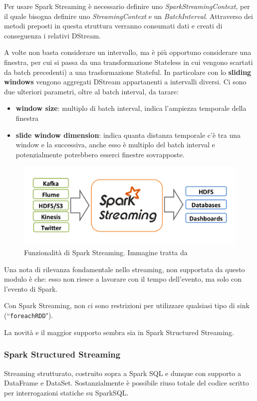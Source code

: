 \documentclass[12pt,italian]{article}
\begin{document}
Per usare Spark Streaming è necessario definire uno \textit{SparkStreamingContext}, per il quale bisogna definire uno \textit{StreamingContext} e un \textit{BatchInterval}.
Attraverso dei metodi preposti in questa struttura verranno consumati dati e creati di conseguenza i relativi DStream.

A volte non basta considerare un intervallo, ma è più opportuno considerare una finestra, per cui si passa da una transformazione Stateless in cui vengono scartati da batch precedenti) a una trasformazione Stateful. In particolare con lo \textbf{sliding windows} vengono aggregati DStream appartanenti a intervalli diversi.
Ci sono due ulteriori parametri, oltre al batch interval, da tarare:
\begin{itemize}
	\item \textbf{window size}: multiplo di batch interval, indica l'ampiezza temporale della finestra
	\item \textbf{slide window dimension}: indica quanta distanza temporale c'è tra una window e la successiva, anche esso è multiplo del batch interval e potenzialmente potrebbero esserci finestre sovrapposte.
\end{itemize}
\begin{figure}
	\centering 
	\includegraphics[width=0.8\linewidth]{img/sparkStreaming.png}
	\caption{Funzionalità di Spark Streaming. Immagine tratta da \cite{spark}}
	\label{fig:SparkStreaming}
\end{figure}
\par Una nota di rilevanza fondamentale nello streaming, non supportata da questo modulo è che: esso non riesce a lavorare con il tempo dell'evento, ma solo con l'evento di Spark.

\par Con Spark Streaming, non ci sono restrizioni per utilizzare qualsiasi tipo di sink (``\texttt{foreachRDD}"). %

\par La novità e il maggior supporto sembra sia in Spark Structured Streaming.
\subsubsection{Spark Structured Streaming}
Streaming strutturato, costruito sopra a Spark SQL e dunque con supporto a DataFrame e DataSet. 
Sostanzialmente è possibile riuso totale del codice scritto per interrogazioni statiche su SparkSQL.
\end{document}
